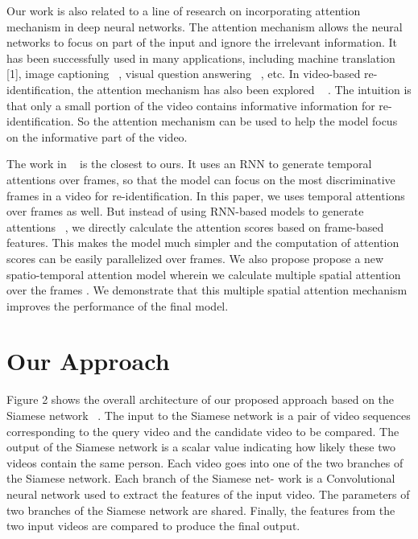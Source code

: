 \documentclass[sigconf, authordraft,review=false]{acmart}
\begin{document}
Our work is also related to a line of research on incorporating attention mechanism in deep neural networks. The
attention mechanism allows the neural networks to focus on
part of the input and ignore the irrelevant information. It has
been successfully used in many applications, including machine translation [1], image captioning ~\cite{xu15_icml}, visual question
answering ~\cite{shih16_cvpr}, etc. In video-based re-identification, the attention  mechanism  has  also  been  explored ~\cite{xu17_iccv,zhou17_cvpr} . The
intuition is that only a small portion of the video contains
informative information for re-identification.  So the attention mechanism can be used to help the model focus on the informative part of the video.

The work in ~\cite{zhou17_cvpr} is the closest to ours. It uses an RNN to
generate temporal attentions over frames, so that the model
can focus on the most discriminative frames in a video for
re-identification.  In this paper, we uses temporal attentions
over frames as well. But instead of using RNN-based models to generate attentions ~\cite{zhou17_cvpr}, we directly calculate the attention scores based on frame-based features.  This makes
the model much simpler and the computation of attention
scores can be easily parallelized over frames.   We also propose propose a new spatio-temporal attention model wherein we calculate multiple spatial attention over the frames .  We demonstrate that this multiple spatial attention mechanism improves the performance of the final model.

\section{Our Approach}
Figure 2 shows the overall architecture of our proposed
approach based on the Siamese network ~\cite{hadsell06_cvpr}.  The input to
the  Siamese  network  is  a  pair  of  video  sequences  corresponding to the query video and the candidate video to be
compared.  The output of the Siamese network is a scalar
value  indicating  how  likely  these  two  videos  contain  the
same person. Each video goes into one of the two branches
of the Siamese network.  Each branch of the Siamese net-
work is a Convolutional neural network used to extract the
features of the input video. The parameters of two branches
of  the  Siamese  network  are  shared.   Finally,  the  features
from the two input videos are compared to produce the final
output.
\end{document}
